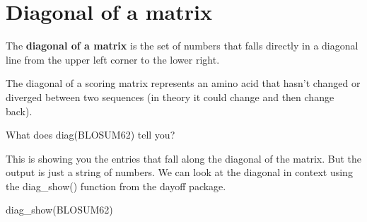 \documentclass[
]{book}
\newenvironment{Shaded}{\begin{snugshade}}{\end{snugshade}}
\newcommand{\FunctionTok}[1]{\textcolor[rgb]{0.00,0.00,0.00}{#1}}
\newcommand{\NormalTok}[1]{#1}
\begin{document}
\hypertarget{diagonal-of-a-matrix}{%
\section{Diagonal of a matrix}\label{diagonal-of-a-matrix}}

The \textbf{diagonal of a matrix} is the set of numbers that falls directly in a diagonal line from the upper left corner to the lower right.

The diagonal of a scoring matrix represents an amino acid that hasn't changed or diverged between two sequences (in theory it could change and then change back).

What does diag(BLOSUM62) tell you?

This is showing you the entries that fall along the diagonal of the matrix. But the output is just a string of numbers. We can look at the diagonal in context using the diag\_show() function from the dayoff package.

\begin{Shaded}
\begin{Highlighting}[]
\FunctionTok{diag\_show}\NormalTok{(BLOSUM62)}
\end{Highlighting}
\end{Shaded}

\providecommand{\docline}[3]{\noalign{\global\setlength{\arrayrulewidth}{#1}}\arrayrulecolor[HTML]{#2}\cline{#3}}

\setlength{\tabcolsep}{2pt}

\renewcommand*{\arraystretch}{1.5}
\end{document}

